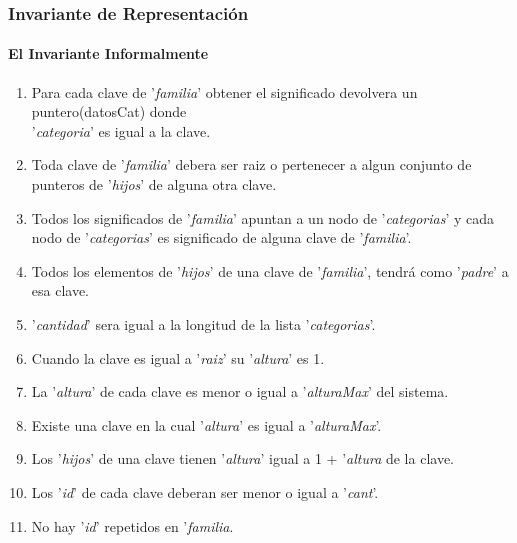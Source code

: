 \subsubsection{Invariante de Representaci\'on}
\paragraph{El Invariante Informalmente}
\begin{enumerate}
\item Para cada clave de '\textit{familia}' obtener el significado devolvera un puntero(datosCat) donde\\ '\textit{categoria}' es igual a la clave.
\item Toda clave de '\textit{familia}' debera ser raiz o pertenecer a algun conjunto de punteros de '\textit{hijos}' de alguna otra clave.
\item Todos los significados de '\textit{familia}' apuntan a un nodo de '\textit{categorias}' y cada nodo de '\textit{categorias}' es significado de alguna clave de '\textit{familia}'.
\item Todos los elementos de '\textit{hijos}' de una clave de '\textit{familia}', tendrá como '\textit{padre}' a esa clave.
\item '\textit{cantidad}' sera igual a la longitud de la lista '\textit{categorias}'.
\item Cuando la clave es igual a '\textit{raiz}' su '\textit{altura}' es 1.
\item La '\textit{altura}' de cada clave es menor o igual a '\textit{alturaMax}' del sistema.
\item Existe una clave en la cual '\textit{altura}' es igual a '\textit{alturaMax}'.
\item Los '\textit{hijos}' de una clave tienen '\textit{altura}' igual a 1 + '\textit{altura} de la clave.
\item Los '\textit{id}' de cada clave deberan ser menor o igual a '\textit{cant}'.
\item No hay '\textit{id}' repetidos en '\textit{familia}.

\end{enumerate}

